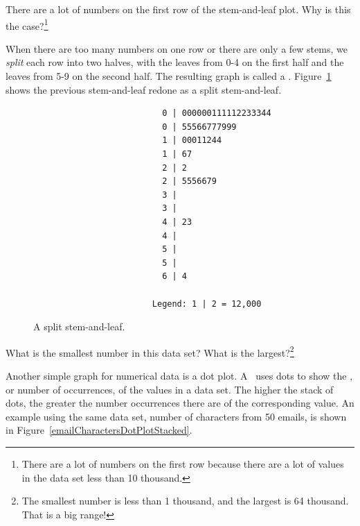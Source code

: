 \begin{exercise}There are a lot of numbers on the first row of the stem-and-leaf plot. Why is this the case?\footnote{There are a lot of numbers on the first row because there are a lot of values in the data set less than 10 thousand.}
\end{exercise}

When there are too many numbers on one row or there are only a few stems, we \emph{split} each row into two halves, with the leaves from 0-4 on the first half and the leaves from 5-9 on the second half. The resulting graph is called a . Figure~\ref{splitstemandleaf50email} shows the previous stem-and-leaf redone as a split stem-and-leaf.

\begin{figure}[h]
\begin{verbatim}
                          0 | 000000111112233344
                          0 | 55566777999
                          1 | 00011244
                          1 | 67
                          2 | 2
                          2 | 5556679
                          3 |
                          3 |
                          4 | 23
                          4 |
                          5 |
                          5 |
                          6 | 4

                        Legend: 1 | 2 = 12,000
\end{verbatim}
\caption{A split stem-and-leaf.}
\label{splitstemandleaf50email}
\end{figure}

\begin{exercise}
What is the smallest number in this data set? What is the largest?\footnote{The smallest number is less than 1 thousand, and the largest is 64 thousand. That is a big range!}
\end{exercise}


Another simple graph for numerical data is a dot plot. A~ uses dots to show the , or number of occurrences, of the values in a data set. The higher the stack of dots, the greater the number occurrences there are of the corresponding value. An example using the same data set, number of characters from 50 emails, is shown in Figure~\ref{emailCharactersDotPlotStacked}.

